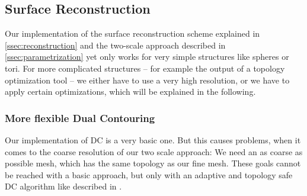 \subsection{Surface Reconstruction}
Our implementation of the surface reconstruction scheme explained in \autoref{ssec:reconstruction} and the two-scale approach described in \autoref{ssec:parametrization} yet only works for very simple structures like spheres or tori. For more complicated structures -- for example the output of a topology optimization tool -- we either have to use a very high resolution, or we have to apply certain optimizations, which will be explained in the following.

\subsubsection{More flexible Dual Contouring}
Our implementation of \ac{DC} is a very basic one. But this causes problems, when it comes to the coarse resolution of our two scale approach: We need an as coarse as possible mesh, which has the same topology as our fine mesh. These goals cannot be reached with a basic approach, but only with an adaptive and topology safe \ac{DC} algorithm like described in \cite{Hermite2002}.

